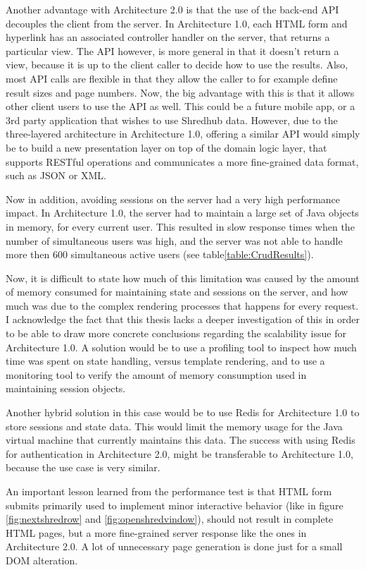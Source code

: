 Another advantage with Architecture 2.0 is that the use of the back-end API decouples the client from the server. In Architecture 1.0, each HTML form and hyperlink has an associated controller handler on the server, that returns a particular view. The API however, is more general in that it doesn't return a view, because it is up to the client caller to decide how to use the results. Also, most API calls are flexible in that they allow the caller to for example  define result sizes and page numbers. Now, the big advantage with this is that it allows other client users to use the API as well. This could be a future mobile app, or a  3rd party application that wishes to use Shredhub data. However, due to the three-layered architecture in Architecture 1.0, offering a similar API would simply be to build a new presentation layer on top of the domain logic layer, that supports RESTful operations and communicates a more fine-grained data format, such as JSON or XML. 

Now in addition, avoiding sessions on the server had a very high performance impact. In Architecture 1.0, the server had to maintain a large set of Java objects in memory, for every current user. This resulted in slow response times when the number of simultaneous users was high, and the server was not able to handle more then 600 simultaneous active users (see table\vref{table:CrudResults}).

Now, it is difficult to state how much of this limitation was caused by the amount of memory consumed for maintaining state and sessions on the server, and how much was due to the complex rendering processes that happens for every request. I acknowledge the fact that this thesis lacks a deeper investigation of this in order to be able to draw more concrete conclusions regarding the scalability issue for Architecture 1.0. A solution would be to use a profiling tool to inspect how much time was spent on state handling, versus template rendering, and to use a monitoring tool to verify the amount of memory consumption used in maintaining session objects. 

Another hybrid solution in this case would be to use Redis for Architecture 1.0 to store sessions and state data. This would limit the memory usage for the Java virtual machine that currently maintains this data. The success with using Redis for authentication in Architecture 2.0, might be transferable to Architecture 1.0, because the use case is very similar. 

An important lesson learned from the performance test is that HTML form submits primarily used to implement minor interactive behavior (like in figure \vref{fig:nextshredrow} and \vref{fig:openshredvindow}), should not result in complete HTML pages, but a more fine-grained server response like the ones in Architecture 2.0. A lot of unnecessary page generation is done just for a small  DOM alteration. 

